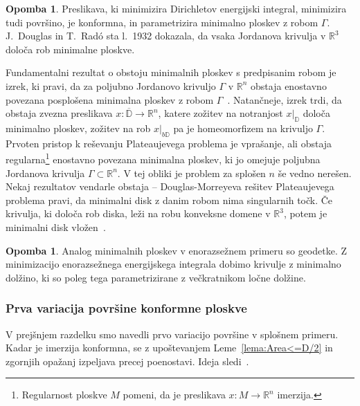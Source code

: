\documentclass[12pt,a4paper,twoside]{article}
\theoremstyle{definition} %
\newtheorem{opomba}[definicija]{Opomba}
\theoremstyle{plain} %
\numberwithin{equation}{section}  %
\newcommand{\R}{\mathbb R}
\begin{document}
\begin{opomba} %
Preslikava, ki minimizira Dirichletov energijski integral, minimizira tudi površino, je konformna, in parametrizira minimalno ploskev z robom $\Gamma$.
J.~Douglas in T.~Rad\'o sta l.~1932 dokazala, da vsaka Jordanova krivulja v $\mathbb{R}^3$ določa rob minimalne ploskve.

Fundamentalni rezultat o obstoju minimalnih ploskev s predpisanim robom je izrek, ki pravi, da za poljubno Jordanovo krivuljo $\Gamma$ v $\R^{n}$ obstaja enostavno povezana posplošena minimalna ploskev z robom $\Gamma$~\cite[Theorem~7.1]{osserman2002survey}. 
Natančneje, izrek trdi, da obstaja zvezna preslikava $x \colon \overline{\mathbb{D}} \to \R^{n}$, katere zožitev na notranjost $x|_{\mathbb{D}}$ določa minimalno ploskev, zožitev na rob $x|_{b\mathbb{D}}$ pa je homeomorfizem na krivuljo $\Gamma$.
\newline
Prvoten pristop k reševanju Plateaujevega problema je vprašanje, ali obstaja regularna\footnote{Regularnost ploskve $M$ pomeni, da je preslikava $x \colon M \to \R^{n}$ imerzija.} enostavno povezana minimalna ploskev, ki jo omejuje poljubna Jordanova krivulja $\Gamma \subset \R^{n}$. V tej obliki je problem za splošen $n$ še vedno nerešen.
Nekaj rezultatov vendarle obstaja -- Douglas-Morreyeva rešitev Plateaujevega problema pravi, da minimalni disk z danim robom nima singularnih točk. Če krivulja, ki določa rob diska, leži na robu konveksne domene v $\R^3$, potem je minimalni disk vložen~\cite[str.~3]{forstneric2021minimals}.
\end{opomba}

\begin{opomba}
Analog minimalnih ploskev v enorazsežnem primeru so geodetke. Z minimizacijo enorazsežnega energijskega integrala dobimo krivulje z minimalno dolžino, ki so poleg tega parametrizirane z večkratnikom ločne dolžine. 
\end{opomba}

\subsubsection{Prva variacija površine konformne ploskve}
% 
V prejšnjem razdelku smo navedli prvo variacijo površine v splošnem primeru. Kadar je imerzija konformna, se z upoštevanjem Leme~\ref{lema:Area<=D/2} in zgornjih opažanj izpeljava precej poenostavi. Ideja sledi~\cite[Section~2.2]{forstneric2021minimals}.
\end{document}
